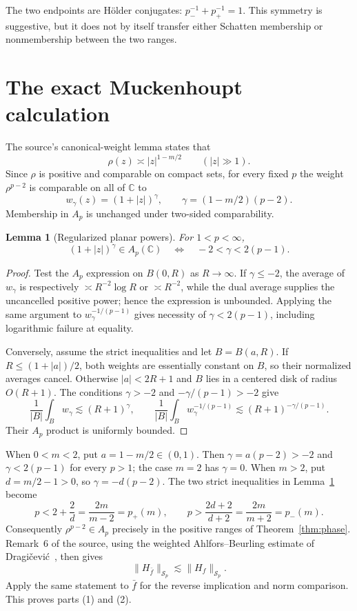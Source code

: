 \documentclass[11pt]{article}
\newtheorem{lemma}{Lemma}
\newcommand{\C}{\mathbb C}
\newcommand{\Sp}{\mathcal S}
\begin{document}
The two endpoints are H\"older conjugates:
$p_-^{-1}+p_+^{-1}=1$.  This symmetry is suggestive, but it does not by
itself transfer either Schatten membership or nonmembership between the two
ranges.

\section{The exact Muckenhoupt calculation}

The source's canonical-weight lemma states that
\begin{equation}\label{eq:rho}
 \rho(z)\asymp |z|^{1-m/2}\qquad(|z|\gg1).
\end{equation}
Since $\rho$ is positive and comparable on compact sets, for every fixed $p$
the weight $\rho^{p-2}$ is comparable on all of $\C$ to
\[
 w_\gamma(z)=(1+|z|)^\gamma,
 \qquad \gamma=(1-m/2)(p-2).
\]
Membership in $A_p$ is unchanged under two-sided comparability.

\begin{lemma}[Regularized planar powers]\label{lem:power}
For $1<p<\infty$,
\[
 (1+|z|)^\gamma\in A_p(\C)
 \quad\Longleftrightarrow\quad
 -2<\gamma<2(p-1).
\]
\end{lemma}

\begin{proof}
Test the $A_p$ expression on $B(0,R)$ as $R\to\infty$.  If
$\gamma\leq-2$, the average of $w_\gamma$ is respectively
$\asymp R^{-2}\log R$ or $\asymp R^{-2}$, while the dual average supplies
the uncancelled positive power; hence the expression is unbounded.  Applying
the same argument to $w_\gamma^{-1/(p-1)}$ gives necessity of
$\gamma<2(p-1)$, including logarithmic failure at equality.

Conversely, assume the strict inequalities and let $B=B(a,R)$.  If
$R\leq(1+|a|)/2$, both weights are essentially constant on $B$, so their
normalized averages cancel.  Otherwise $|a|<2R+1$ and $B$ lies in a centered
disk of radius $O(R+1)$.  The conditions
$\gamma>-2$ and $-\gamma/(p-1)>-2$ give
\[
 \frac1{|B|}\int_B w_\gamma\lesssim(R+1)^\gamma,
 \qquad
 \frac1{|B|}\int_B w_\gamma^{-1/(p-1)}
 \lesssim(R+1)^{-\gamma/(p-1)}.
\]
Their $A_p$ product is uniformly bounded.
\end{proof}

When $0<m<2$, put $a=1-m/2\in(0,1)$.  Then
$\gamma=a(p-2)>-2$ and $\gamma<2(p-1)$ for every $p>1$; the case $m=2$
has $\gamma=0$.  When $m>2$, put $d=m/2-1>0$, so
$\gamma=-d(p-2)$.  The two strict inequalities in Lemma~\ref{lem:power}
become
\[
 p<2+\frac2d=\frac{2m}{m-2}=p_+(m),
 \qquad
 p>\frac{2d+2}{d+2}=\frac{2m}{m+2}=p_-(m).
\]
Consequently $\rho^{p-2}\in A_p$ precisely in the positive ranges of
Theorem~\ref{thm:phase}.  Remark~6 of the source, using the weighted
Ahlfors--Beurling estimate of Dragi\v cevi\'c~\cite{dragicevic}, then gives
\[
 \|H_{\bar f}\|_{\Sp_p}\lesssim\|H_f\|_{\Sp_p}.
\]
Apply the same statement to $\bar f$ for the reverse implication and norm
comparison.  This proves parts (1) and (2).
\end{document}
